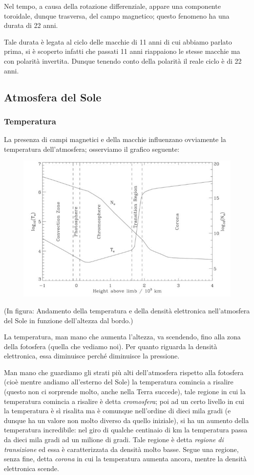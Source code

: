 Nel tempo, a causa della rotazione differenziale, appare una componente toroidale, dunque trasversa, del campo magnetico; questo fenomeno ha una durata di 22 anni.

Tale durata è legata al ciclo delle macchie di 11 anni di cui abbiamo parlato prima, si è scoperto infatti che passati 11 anni riappaiono le stesse macchie ma con polarità invertita. Dunque tenendo conto della polarità il reale ciclo è di 22 anni.

\subsection{Atmosfera del Sole}
\subsubsection{Temperatura}
La presenza di campi magnetici e della macchie influenzano ovviamente la temperatura dell'atmosfera; osserviamo il grafico seguente:

\begin{figure}[H]
    \centering
    \includegraphics[width=12cm]{2dic/TemperatureAtmosfera.jpg}
    \label{fig:Temp}
\end{figure}

(In figura: Andamento della temperatura e della densità elettronica nell'atmosfera del Sole in funzione dell'altezza dal bordo.)

La temperatura, man mano che aumenta l'altezza, va scendendo, fino alla zona della fotosfera (quella che vediamo noi). Per quanto riguarda la densità elettronica, essa diminuisce perché diminuisce la pressione.

Man mano che guardiamo gli strati più alti dell'atmosfera rispetto alla fotosfera (cioè mentre andiamo all'esterno del Sole) la temperatura comincia a risalire (questo non ci sorprende molto, anche nella Terra succede), tale regione in cui la temperatura comincia a risalire è detta \textit{cromosfera}; poi ad un certo livello in cui la temperatura è sì risalita ma è comunque nell'ordine di dieci mila gradi (e dunque ha un valore non molto diverso da quello iniziale), si ha un aumento della temperatura incredibile: nel giro di qualche centinaio di km la temperatura passa da dieci mila gradi ad un milione di gradi. Tale regione è detta \textit{regione di transizione} ed essa è caratterizzata da densità molto basse. Segue una regione, senza fine, detta \textit{corona} in cui la temperatura aumenta ancora, mentre la densità elettronica scende.

